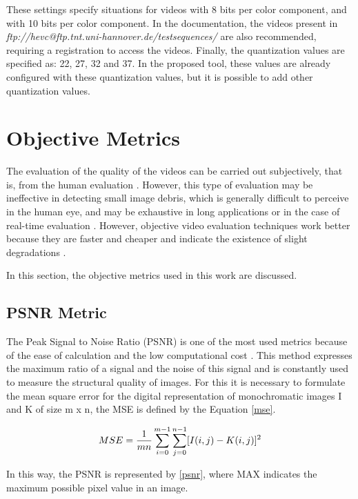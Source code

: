\documentclass[journal]{IEEEtran}
\begin{document}
These settings specify situations for videos with 8 bits per color component, and with 10 bits per color component. In the documentation, the videos present in \emph{ftp://hevc@ftp.tnt.uni-hannover.de/testsequences/} are also recommended, requiring a registration to access the videos. Finally, the quantization values are specified as: 22, 27, 32 and 37. In the proposed tool, these values are already configured with these quantization values, but it is possible to add other quantization values.

\section{Objective Metrics}

The evaluation of the quality of the videos can be carried out subjectively, that is, from the human evaluation \cite{itu:99}. However, this type of evaluation may be ineffective in detecting small image debris, which is generally difficult to perceive in the human eye, and may be exhaustive in long applications or in the case of real-time evaluation \cite{estrada:09}\cite{regis:12}. However, objective video evaluation techniques work better because they are faster and cheaper and indicate the existence of slight degradations \cite{regis:12}.

In this section, the objective metrics used in this work are discussed.

\subsection{PSNR Metric}

The Peak Signal to Noise Ratio (PSNR) is one of the most used metrics because of the ease of calculation and the low computational cost \cite{danilo:15}. This method expresses the maximum ratio of a signal and the noise of this signal and is constantly used to measure the structural quality of images. For this it is necessary to formulate the mean square error for the digital representation of monochromatic images I and K of size m x n, the MSE is defined by the Equation \ref{mse}.

\begin{equation}
	\centering
	\label{mse}
	MSE=\frac{1}{mn}\sum_{i=0}^{m-1}\sum_{j=0}^{n-1}[I(i,j)-K(i,j)]^{2}
\end{equation}

In this way, the PSNR is represented by \ref{psnr}, where MAX indicates the maximum possible pixel value in an image.
\end{document}

